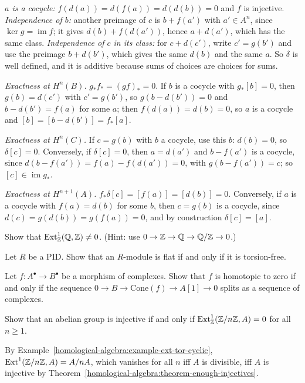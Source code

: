\begin{solution}
\emph{$a$ is a cocycle:} $f(d(a)) = d(f(a)) = d(d(b)) = 0$ and $f$ is injective. \emph{Independence of $b$:} another preimage
of $c$ is $b + f(a')$ with $a' \in A^n$, since $\ker g = \operatorname{im} f$; it gives $d(b) + f(d(a'))$, hence $a + d(a')$, which has
the same class. \emph{Independence of $c$ in its class:} for $c + d(c')$, write $c' = g(b')$ and use the preimage $b + d(b')$, which
gives the same $d(b)$ and the same $a$. So $\delta$ is well defined, and it is additive because sums of choices are choices for
sums.

\emph{Exactness at $H^n(B)$.} $g_*f_* = (gf)_* = 0$. If $b$ is a cocycle with $g_*[b] = 0$, then $g(b) = d(c')$ with $c' = g(b')$,
so $g(b - d(b')) = 0$ and $b - d(b') = f(a)$ for some $a$; then $f(d(a)) = d(b) = 0$, so $a$ is a cocycle and
$[b] = [b - d(b')] = f_*[a]$.

\emph{Exactness at $H^n(C)$.} If $c = g(b)$ with $b$ a cocycle, use this $b$: $d(b) = 0$, so $\delta[c] = 0$. Conversely, if
$\delta[c] = 0$, then $a = d(a')$ and $b - f(a')$ is a cocycle, since $d(b - f(a')) = f(a) - f(d(a')) = 0$, with
$g(b - f(a')) = c$; so $[c] \in \operatorname{im} g_*$.

\emph{Exactness at $H^{n+1}(A)$.} $f_*\delta[c] = [f(a)] = [d(b)] = 0$. Conversely, if $a$ is a cocycle with $f(a) = d(b)$ for some
$b$, then $c = g(b)$ is a cocycle, since $d(c) = g(d(b)) = g(f(a)) = 0$, and by construction $\delta[c] = [a]$.
\end{solution}

\begin{exercise}\label{homological-algebra:exercise-ext-divisible}
Show that $\operatorname{Ext}^1_{\mathbb{Z}}(\mathbb{Q}, \mathbb{Z}) \neq 0$. (Hint: use $0 \to \mathbb{Z} \to \mathbb{Q} \to \mathbb{Q}/\mathbb{Z} \to 0$.)
\end{exercise}

\begin{exercise}\label{homological-algebra:exercise-tor-torsion-free}
Let $R$ be a PID. Show that an $R$-module is flat if and only if it is torsion-free.
\end{exercise}

\begin{exercise}\label{homological-algebra:exercise-derived-cone}
Let $f \colon A^\bullet \to B^\bullet$ be a morphism of complexes. Show that $f$ is homotopic to zero if and only if the sequence
$0 \to B \to \mathrm{Cone}(f) \to A[1] \to 0$ splits as a sequence of complexes.
\end{exercise}

\begin{exercise}\label{homological-algebra:exercise-injective-dimension}
Show that an abelian group is injective if and only if $\operatorname{Ext}^1_{\mathbb{Z}}(\mathbb{Z}/n\mathbb{Z}, A) = 0$ for all $n \geq 1$.
\end{exercise}

\begin{solution}
By Example~\ref{homological-algebra:example-ext-tor-cyclic}, $\operatorname{Ext}^1(\mathbb{Z}/n\mathbb{Z}, A) = A/nA$, which vanishes for all $n$ iff $A$ is
divisible, iff $A$ is injective by Theorem~\ref{homological-algebra:theorem-enough-injectives}.
\end{solution}
